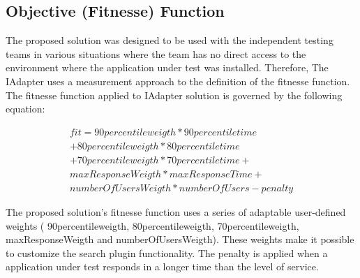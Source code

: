 \subsection{Objective (Fitnesse) Function}

The proposed solution was designed to be used with the independent testing teams in various situations where the team has no direct access to the environment where the application under test was installed. Therefore,  The IAdapter uses a measurement approach to the definition of the fitnesse function. The fitnesse function applied to IAdapter solution is governed by the following equation:

\begin{equation}
\begin{aligned}
fit=90percentileweigth* 90percentiletime\\
+80percentileweigth*80percentiletime\\+
70percentileweigth*70percentiletime+\\
maxResponseWeigth*maxResponseTime+\\
numberOfUsersWeigth*numberOfUsers-penalty
\end{aligned}
\end{equation}

The proposed solution's fitnesse function uses a series of adaptable user-defined weights ( 90percentileweigth, 80percentileweigth,  70percentileweigth, maxResponseWeigth and numberOfUsersWeigth). These weights make it possible to customize the search plugin functionality. The penalty is applied when a application under test responds in a longer time than the level of service.



